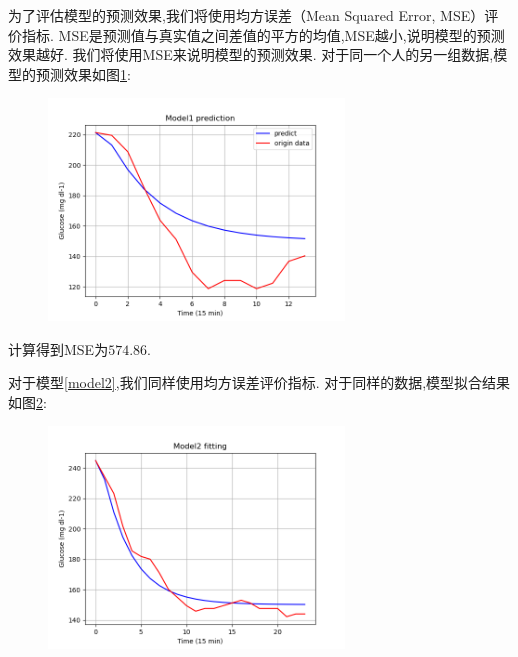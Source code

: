     为了评估模型的预测效果,我们将使用均方误差（Mean Squared Error, MSE）评价指标. MSE是预测值与真实值之间差值的平方的均值,MSE越小,说明模型的预测效果越好. 我们将使用MSE来说明模型的预测效果. 对于同一个人的另一组数据,模型的预测效果如图\ref{fig:predict_1}:
    \begin{figure}[H]
        \centering
        \includegraphics[width=0.7\textwidth]{Img/predict_1.png}
        \label{fig:predict_1}
    \end{figure}

    计算得到MSE为$574.86$. 

    对于模型\ref{model2},我们同样使用均方误差评价指标. 对于同样的数据,模型拟合结果如图\ref{fig:fit}:
    \begin{figure}[H]
        \centering
        \includegraphics[width=0.7\textwidth]{Img/fit.png}
        \label{fig:fit}
    \end{figure}

